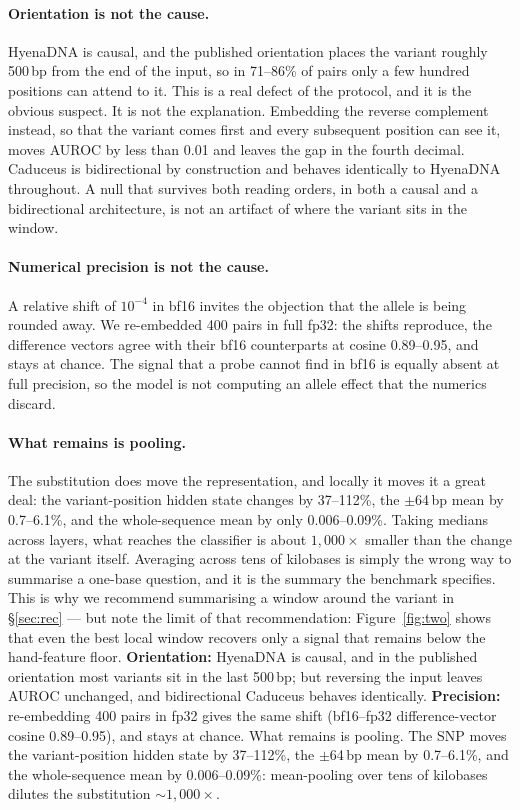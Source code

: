 \ifdefined\RECOMB
\paragraph{Orientation is not the cause.} HyenaDNA is causal, and the published
orientation places the variant roughly 500\,bp from the end of the input, so in
71--86\% of pairs only a few hundred positions can attend to it. This is a real
defect of the protocol, and it is the obvious suspect. It is not the explanation.
Embedding the reverse complement instead, so that the variant comes first and
every subsequent position can see it, moves AUROC by less than 0.01 and leaves
the  gap in the fourth decimal. Caduceus is bidirectional by
construction and behaves identically to HyenaDNA throughout. A null that survives
both reading orders, in both a causal and a bidirectional architecture, is not an
artifact of where the variant sits in the window.

\paragraph{Numerical precision is not the cause.} A relative shift of $10^{-4}$
in bf16 invites the objection that the allele is being rounded away. We
re-embedded 400 pairs in full fp32: the shifts reproduce, the difference vectors
agree with their bf16 counterparts at cosine 0.89--0.95, and \diffonly{} stays at
chance. The signal that a probe cannot find in bf16 is equally absent at full
precision, so the model is not computing an allele effect that the numerics
discard.

\paragraph{What remains is pooling.} The substitution does move the
representation, and locally it moves it a great deal: the variant-position hidden
state changes by 37--112\%, the $\pm$64\,bp mean by 0.7--6.1\%, and the
whole-sequence mean by only 0.006--0.09\%. Taking medians across layers, what
reaches the classifier is about $1{,}000\times$ smaller than the change at the
variant itself. Averaging across tens of kilobases is simply the wrong way to
summarise a one-base question, and it is the summary the benchmark specifies.
This is why we recommend summarising a window around the variant in
\S\ref{sec:rec} --- but note the limit of that recommendation:
Figure~\ref{fig:two} shows that even the best local window recovers only a signal
that remains below the hand-feature floor.
\else
\textbf{Orientation:} HyenaDNA is causal, and in the published
orientation most variants sit in the last 500\,bp; but reversing the input leaves
AUROC unchanged, and bidirectional Caduceus behaves identically.
\textbf{Precision:} re-embedding 400 pairs in fp32 gives the same shift
(bf16--fp32 difference-vector cosine 0.89--0.95), and \diffonly{} stays at
chance. What remains is pooling. The SNP moves the variant-position hidden state
by 37--112\%, the $\pm$64\,bp mean by 0.7--6.1\%, and the whole-sequence mean by
0.006--0.09\%: mean-pooling over tens of kilobases dilutes the substitution
${\sim}1{,}000\times$.
\fi

